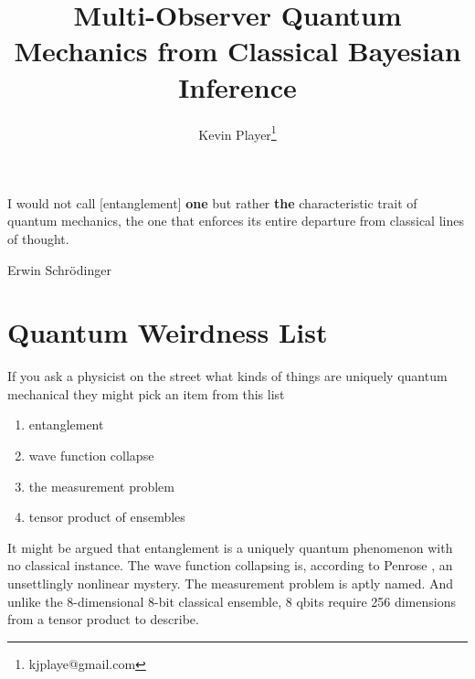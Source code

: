 \documentclass[12pt,a4paper]{article}
\begin{document}
\title{Multi-Observer Quantum Mechanics from Classical Bayesian Inference}
\author[1]{Kevin Player\footnote{kjplaye@gmail.com}}

\maketitle


\epigraph{I would not call [entanglement] {\bf one} but rather {\bf the} characteristic trait of quantum mechanics, the one that enforces its entire departure from classical lines of thought.}{Erwin Schrödinger}


\section{Quantum Weirdness List}
If you ask a physicist on the street what kinds of things are uniquely quantum mechanical they might pick an item from this list

\begin{enumerate}
\item entanglement
\item wave function collapse
\item the measurement problem
\item tensor product of ensembles
\end{enumerate}

It might be argued that entanglement is a uniquely quantum phenomenon with no classical instance.  The wave function collapsing is, according to Penrose \cite{penrose}, an unsettlingly nonlinear mystery.  The measurement problem is aptly named.  And unlike the 8-dimensional 8-bit classical ensemble, 8 qbits require 256 dimensions from a tensor product to describe.
\end{document}
